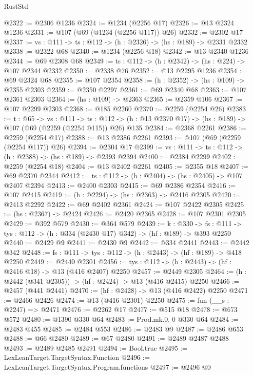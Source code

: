 \begin{lexlean}{RustStd}
\begin{coremodule}
{\begin{coremodule}
{{{@2322 := @2306 @1236
@2324 := @1234 (@2256 @17)
@2326 := @13 @2324 @1236
@2331 := @107 (@69 (@1234 (@2256 @117)) @26)
@2332 := @2302 @17
@2337 := {vs : @111} -> {ts : @112} -> (h : @2326) -> (hs : @189) -> @2331 @2332
@2338 := @2322 @68
@2340 := @1234 (@2256 @18)
@2342 := @13 @2340 @1236
@2344 := @69 @2308 @68
@2349 := {ts : @112} -> (h : @2342) -> (hs : @224) -> @107 @2344 @2332
@2350 := @2338 @76
@2352 := @13 @2295 @1236
@2354 := @69 @2324 @68
@2355 := @107 @2354
@2358 := (h : @2352) -> (hs : @109) -> @2355 @2303
@2359 := @2350 @2297
@2361 := @69 @2340 @68
@2363 := @107 @2361 @2303
@2364 := (hs : @109) -> @2363
@2365 := @2359 @106
@2367 := @107 @2299 @2303
@2368 := @185 @2260
@2370 := @2259 (@2254 @26)
@2383 := {t : @65} ->
  {vs : @111} ->
  {ts : @112} -> (h : @13 @2370 @17) -> (hs : @189) -> @107 (@69 (@2259 (@2254 @115)) @26) @135
@2384 := @2368 @2261
@2386 := @2259 (@2254 @17)
@2388 := @13 @2386 @2261
@2393 := @107 (@69 (@2259 (@2254 @117)) @26)
@2394 := @2304 @17
@2399 := {vs : @111} -> {ts : @112} -> (h : @2388) -> (hs : @189) -> @2393 @2394
@2400 := @2384 @2299
@2402 := @2259 (@2254 @18)
@2404 := @13 @2402 @2261
@2405 := @2355 @18
@2407 := @69 @2370 @2344
@2412 := {ts : @112} -> (h : @2404) -> (hs : @2405) -> @107 @2407 @2394
@2413 := @2400 @2303
@2415 := @69 @2386 @2354
@2416 := @107 @2415
@2419 := (h : @2294) -> (hs : @2363) -> @2416 @2305
@2420 := @2413 @2292
@2422 := @69 @2402 @2361
@2424 := @107 @2422 @2305
@2425 := (hs : @2367) -> @2424
@2426 := @2420 @2365
@2428 := @107 @2301 @2305
@2429 := @392 @579
@2430 := @364 @579
@2439 := {k : @330} ->
  {fs : @111} -> {tys : @112} -> (h : @334 (@2430 @17) @342) -> (hf : @189) -> @393 @2250
@2440 := @2429 @9
@2441 := @2430 @9
@2442 := @334 @2441
@2443 := @2442 @342
@2448 := {fs : @111} -> {tys : @112} -> (h : @2443) -> (hf : @189) -> @418 @2250
@2449 := @2440 @2301
@2456 := {tys : @112} -> (h : @2443) -> (hf : @2416 @18) -> @13 (@416 @2407) @2250
@2457 := @2449 @2305
@2464 := (h : @2442 (@341 @2305)) -> (hf : @2424) -> @13 (@416 @2415) @2250
@2466 := @2457 (@441 @2441)
@2470 := (hf : @2428) -> @13 (@416 @2422) @2250
@2471 := @2466 @2426
@2474 := @13 (@416 @2301) @2250
@2475 := fun (__s : @2247) => @2471
@2476 := @2262 @17
@2477 := @515 @18
@2478 := @673 @572
@2480 := @1390 @330 @64
@2483 := Prod.mk.{0, 0} @330 @64
@2484 := @2483 @455
@2485 := @2484 @553
@2486 := @2483 @9
@2487 := @2486 @653
@2488 := @66 @2480
@2489 := @67 @2480
@2491 := @2489 @2487 @2488
@2493 := @2489 @2485 @2491
@2494 := Bool.true
@2495 := LexLeanTarget.TargetSyntax.Function
@2496 := LexLeanTarget.TargetSyntax.Program.functions
@2497 := @2496 @0
}}}
\end{coremodule}}
\end{coremodule}
\end{lexlean}
